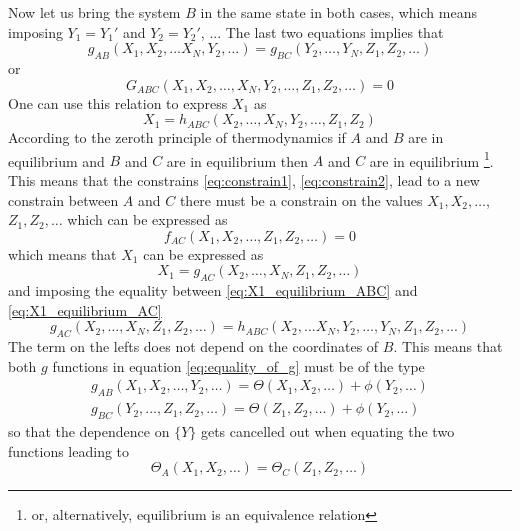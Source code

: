 Now let us bring the system $B$ in the same state in both cases, which means imposing $Y_1 = Y_1'$ and $Y_2 = Y_2'$, ... The last two equations implies that 
\begin{equation}
    g_{AB} (X_1, X_2, \dots X_N, Y_2, \dots) = g_{BC} (Y_2, \dots, Y_N, Z_1, Z_2, \dots)
    \label{eq:equality_of_g}
\end{equation}
or
\begin{equation*}
    G_{ABC} (X_1, X_2, \dots, X_N, Y_2, \dots, Z_1, Z_2, \dots) = 0
\end{equation*}
One can use this relation to express $X_1$ as 
\begin{equation}
    X_1 = h_{ABC}(X_2, \dots, X_N, Y_2, \dots, Z_1, Z_2)
    \label{eq:X1_equilibrium_ABC}
\end{equation}
According to the zeroth principle of thermodynamics if $A$ and $B$ are in equilibrium and $B$ and $C$ are in equilibrium then $A$ and $C$ are in equilibrium 
\footnote{or, alternatively, equilibrium is an equivalence relation}. This means that the constrains \ref{eq:constrain1}, \ref{eq:constrain2}, lead to a new constrain between $A$ and $C$
there must be a constrain on the values ${X_1, X_2, \dots}$, ${Z_1, Z_2, \dots}$ which can be expressed as 
\begin{equation*}
    f_{AC} (X_1, X_2, \dots, Z_1, Z_2, \dots) = 0
\end{equation*}
which means that $X_1$ can be expressed as
\begin{equation}
    X_1 = g_{AC} (X_2, \dots, X_N, Z_1, Z_2, \dots)
    \label{eq:X1_equilibrium_AC}
\end{equation}
and imposing the equality between \ref{eq:X1_equilibrium_ABC} and \ref{eq:X1_equilibrium_AC}
\begin{equation*}
    g_{AC} (X_2, \dots, X_N, Z_1, Z_2, \dots) = h_{ABC}(X_2, \dots X_N, Y_2, \dots, Y_N, Z_1, Z_2, ...)
\end{equation*}
The term on the lefts does not depend on the coordinates of $B$. This means that both $g$ functions in equation \ref{eq:equality_of_g} must be of the type
\begin{gather*}
    g_{AB}(X_1, X_2, \dots, Y_2, \dots) = \Theta(X_1, X_2, \dots) + \phi(Y_2, \dots) \\
    g_{BC}(Y_2, \dots, Z_1, Z_2, \dots) = \Theta(Z_1, Z_2, \dots) + \phi(Y_2, \dots)
\end{gather*}
so that the dependence on $\{Y\}$ gets cancelled out when equating the two functions leading to 
\begin{equation*}
    \Theta_A(X_1, X_2, \dots) = \Theta_C(Z_1, Z_2, \dots)
\end{equation*}
